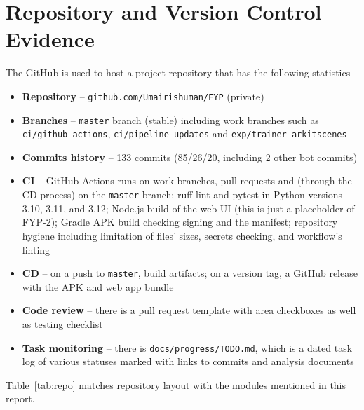 \section{Repository and Version Control Evidence}
The GitHub is used to host a project repository that has the following statistics --
\begin{itemize}
    \item \textbf{Repository} -- \texttt{github.com/Umairishuman/FYP} (private)
    \item \textbf{Branches} -- \texttt{master} branch (stable) including work branches such as \texttt{ci/github-actions}, \texttt{ci/pipeline-updates} and \texttt{exp/trainer-arkitscenes}
    \item \textbf{Commits history} -- 133 commits (85/26/20, including 2 other bot commits)
    \item \textbf{CI} -- GitHub Actions runs on work branches, pull requests and (through the CD process) on the \texttt{master} branch: ruff lint and pytest in Python versions 3.10, 3.11, and 3.12; Node.js build of the web UI (this is just a placeholder of FYP-2); Gradle APK build checking signing and the manifest; repository hygiene including limitation of files' sizes, secrets checking, and workflow's linting
    \item \textbf{CD} -- on a push to \texttt{master}, build artifacts; on a version tag, a GitHub release with the APK and web app bundle
    \item \textbf{Code review} -- there is a pull request template with area checkboxes as well as testing checklist
    \item \textbf{Task monitoring} -- there is \texttt{docs/progress/TODO.md}, which is a dated task log of various statuses marked with links to commits and analysis documents
\end{itemize}

Table~\ref{tab:repo} matches repository layout with the modules mentioned in this report.

